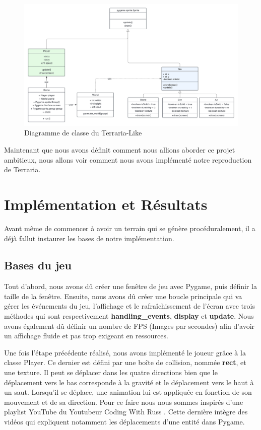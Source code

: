 \documentclass[12pt]{article}
\begin{document}
\begin{figure}[!h]
  \centering
  \includegraphics[width=\textwidth]{assets/UML_class.png}
  \caption{Diagramme de classe du Terraria-Like}
  \label{UML_class}
\end{figure}

Maintenant que nous avons définit comment nous allions aborder ce projet ambitieux, nous allons voir comment nous avons implémenté notre reproduction de Terraria.
\newpage
\section{Implémentation et Résultats}
\label{Implémentation}

Avant même de commencer à avoir un terrain qui se génère procéduralement, il a déjà fallut instaurer les bases de notre implémentation.

\subsection{Bases du jeu}

Tout d'abord, nous avons dû créer une fenêtre de jeu avec Pygame, puis définir la taille de la fenêtre. Ensuite, nous avons dû créer une boucle principale qui va gérer les événements du jeu, l'affichage et le rafraîchissement de l'écran avec trois méthodes qui sont respectivement \textbf{handling\_events}, \textbf{display} et \textbf{update}. Nous avons également dû définir un nombre de FPS (Images par secondes) afin d'avoir un affichage fluide et pas trop exigeant en ressources.\par
Une fois l'étape précédente réalisé, nous avons implémenté le joueur grâce à la classe Player. Ce dernier est défini par une boîte de collision, nommée \textbf{rect}, et une texture. Il peut se déplacer dans les quatre directions bien que le déplacement vers le bas corresponde à la gravité et le déplacement vers le haut à un saut. Lorsqu'il se déplace, une animation lui est appliquée en fonction de son mouvement et de sa direction. Pour ce faire nous nous sommes inspirés d'une playlist YouTube du Youtubeur Coding With Russ \cite{codingwithruss-playlist}. Cette dernière intègre des vidéos qui expliquent notamment les déplacements d'une entité dans Pygame.\par
\end{document}
